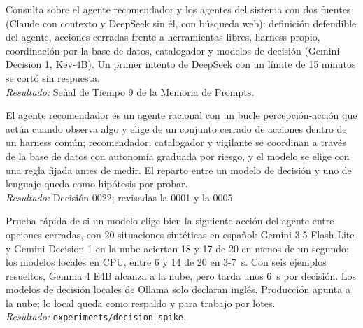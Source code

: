 \documentclass[11pt,a4paper]{article}
\newcommand{\actividad}[3]{\item[\textbf{[#1]}] #2 \\ \textit{Resultado:} #3}
\begin{document}
\begin{description}[leftmargin=0pt, itemsep=6pt]
		\actividad{Investigación}{Consulta sobre el agente recomendador y los agentes del sistema con dos fuentes (Claude con contexto y DeepSeek sin él, con búsqueda web): definición defendible del agente, acciones cerradas frente a herramientas libres, harness propio, coordinación por la base de datos, catalogador y modelos de decisión (Gemini Decision 1, Kev-4B). Un primer intento de DeepSeek con un límite de 15 minutos se cortó sin respuesta.}{Señal de Tiempo 9 de la Memoria de Prompts.}
		\actividad{Decisión}{El agente recomendador es un agente racional con un bucle percepción-acción que actúa cuando observa algo y elige de un conjunto cerrado de acciones dentro de un harness común; recomendador, catalogador y vigilante se coordinan a través de la base de datos con autonomía graduada por riesgo, y el modelo se elige con una regla fijada antes de medir. El reparto entre un modelo de decisión y uno de lenguaje queda como hipótesis por probar.}{Decisión 0022; revisadas la 0001 y la 0005.}
		\actividad{Análisis}{Prueba rápida de si un modelo elige bien la siguiente acción del agente entre opciones cerradas, con 20 situaciones sintéticas en español: Gemini 3.5 Flash-Lite y Gemini Decision 1 en la nube aciertan 18 y 17 de 20 en menos de un segundo; los modelos locales en CPU, entre 6 y 14 de 20 en 3-7~s. Con seis ejemplos resueltos, Gemma 4 E4B alcanza a la nube, pero tarda unos 6~s por decisión. Los modelos de decisión locales de Ollama solo declaran inglés. Producción apunta a la nube; lo local queda como respaldo y para trabajo por lotes.}{\texttt{experiments/decision-spike}.}
	\end{description}
\end{document}
